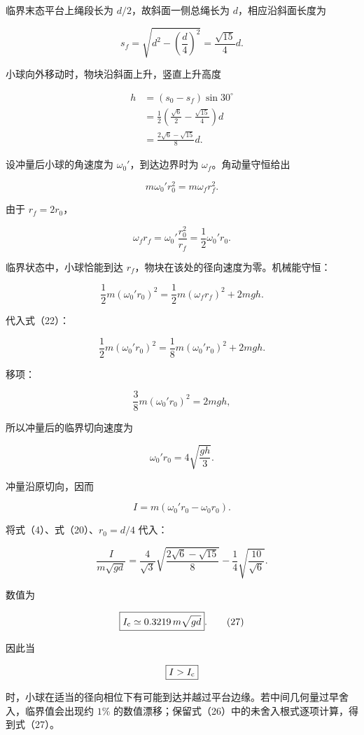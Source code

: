 \documentclass[12pt,a4paper,UTF8]{ctexart}
\begin{document}
临界末态平台上绳段长为 \(d/2\)，故斜面一侧总绳长为
\(d\)，相应沿斜面长度为

\[
s_f=\sqrt{d^2-\left(\frac d4\right)^2}
=\frac{\sqrt{15}}4d.
\tag{19}
\]

小球向外移动时，物块沿斜面上升，竖直上升高度

\[
\begin{aligned}
h
&=(s_0-s_f)\sin30^\circ\\
&=\frac12\left(\frac{\sqrt6}{2}-\frac{\sqrt{15}}4\right)d\\
&=\frac{2\sqrt6-\sqrt{15}}8d.
\end{aligned}
\tag{20}
\]

设冲量后小球的角速度为 \(\omega_0'\)，到达边界时为
\(\omega_f\)。角动量守恒给出

\[
m\omega_0'r_0^2=m\omega_fr_f^2.
\tag{21}
\]

由于 \(r_f=2r_0\)，

\[
\omega_fr_f
=\omega_0'\frac{r_0^2}{r_f}
=\frac12\omega_0'r_0.
\tag{22}
\]

临界状态中，小球恰能到达 \(r_f\)，物块在该处的径向速度为零。机械能守恒：

\[
\frac12m(\omega_0'r_0)^2
=\frac12m(\omega_fr_f)^2+2mgh.
\tag{23}
\]

代入式（22）：

\[
\frac12m(\omega_0'r_0)^2
=\frac18m(\omega_0'r_0)^2+2mgh.
\]

移项：

\[
\frac38m(\omega_0'r_0)^2=2mgh,
\]

所以冲量后的临界切向速度为

\[
\omega_0'r_0=4\sqrt{\frac{gh}{3}}.
\tag{24}
\]

冲量沿原切向，因而

\[
I=m\left(\omega_0'r_0-\omega_0r_0\right).
\tag{25}
\]

将式（4）、式（20）、\(r_0=d/4\) 代入：

\[
\frac{I}{m\sqrt{gd}}
=\frac4{\sqrt3}
\sqrt{\frac{2\sqrt6-\sqrt{15}}8}
-\frac14\sqrt{\frac{10}{\sqrt6}}.
\tag{26}
\]

数值为

\[
\boxed{I_{\rm c}\simeq0.3219\,m\sqrt{gd}}.
\tag{27}
\]

因此当

\[
\boxed{I>I_{\rm c}}
\]

时，小球在适当的径向相位下有可能到达并越过平台边缘。若中间几何量过早舍入，临界值会出现约
\(1\%\) 的数值漂移；保留式（26）中的未舍入根式逐项计算，得到式（27）。
\end{document}
